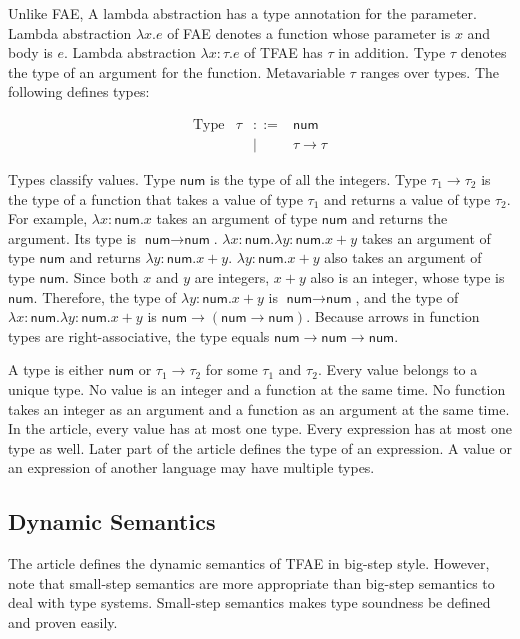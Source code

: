 Unlike FAE, A lambda abstraction has a type annotation for the parameter. Lambda
abstraction $\lambda x.e$ of FAE denotes a function whose parameter is $x$ and
body is $e$. Lambda abstraction $\lambda x:\tau.e$ of TFAE has $\tau$ in
addition. Type $\tau$ denotes the type of an argument for the function.
Metavariable $\tau$ ranges over types. The following defines types:

\[
\begin{array}{lrcl}
\text{Type} & \tau & ::= & \textsf{num} \\
&& | & \tau\rightarrow\tau
\end{array}
\]

Types classify values. Type $\textsf{num}$ is the type of all the integers. Type
$\tau_1\rightarrow\tau_2$ is the type of a function that takes a value of type
$\tau_1$ and returns a value of type $\tau_2$. For example, $\lambda
x:\textsf{num}.x$ takes an argument of type $\textsf{num}$ and returns the
argument. Its type is $\textsf{num}\rightarrow\textsf{num}$. $\lambda
x:\textsf{num}.\lambda y:\textsf{num}.x+y$ takes an argument of type
$\textsf{num}$ and returns $\lambda y:\textsf{num}.x+y$. $\lambda
y:\textsf{num}.x+y$ also takes an argument of type $\textsf{num}$. Since both $x$
and $y$ are integers, $x+y$ also is an integer, whose type is $\textsf{num}$.
Therefore, the type of $\lambda y:\textsf{num}.x+y$ is
$\textsf{num}\rightarrow\textsf{num}$, and the type of $\lambda
x:\textsf{num}.\lambda y:\textsf{num}.x+y$ is
$\textsf{num}\rightarrow(\textsf{num}\rightarrow\textsf{num})$. Because arrows in
function types are right-associative, the type equals
$\textsf{num}\rightarrow\textsf{num}\rightarrow\textsf{num}$.

A type is either $\textsf{num}$ or $\tau_1\rightarrow\tau_2$ for some $\tau_1$
and $\tau_2$. Every value belongs to a unique type. No value is an integer and a
function at the same time. No function takes an integer as an argument and a
function as an argument at the same time. In the article, every value has at most
one type. Every expression has at most one type as well. Later part of the
article defines the type of an expression. A value or an expression of another
language may have multiple types.

\subsection{Dynamic Semantics}

The article defines the dynamic semantics of TFAE in big-step style. However,
note that small-step semantics are more appropriate than big-step semantics to
deal with type systems. Small-step semantics makes type soundness be defined and
proven easily.

